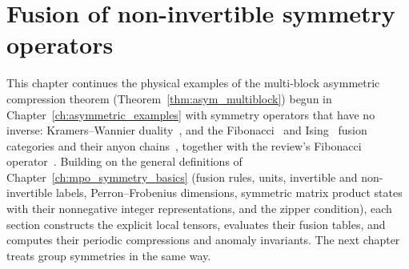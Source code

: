 
\chapter{Fusion of non-invertible symmetry operators}%
\label{ch:asymmetric_examples_non_invertible}

This chapter continues the physical examples of the multi-block asymmetric
compression theorem (Theorem~\ref{thm:asym_multiblock}) begun in
Chapter~\ref{ch:asymmetric_examples} with symmetry operators that have no
inverse: Kramers--Wannier
duality~\cite{KramersWannier1941,Aasen2016Topological,Seiberg2024Majorana,Lootens2023Dualities},
and the Fibonacci~\cite[Appendix~D.1]{Bultinck2017Anyons} and
Ising~\cite[Appendix~D.2]{Bultinck2017Anyons} fusion categories and their
anyon chains~\cite{Feiguin2007GoldenChain}, together with the review's
Fibonacci operator~\cite[Appendix~A, ``The MPO for the Fibonacci model'']{Cirac2021Matrix}.
Building on the general
definitions of Chapter~\ref{ch:mpo_symmetry_basics} (fusion rules, units,
invertible and non-invertible labels, Perron--Frobenius dimensions,
symmetric matrix product states with their nonnegative integer
representations, and the zipper condition), each section constructs
the explicit local tensors, evaluates their fusion tables, and computes
their periodic compressions and anomaly invariants. The next chapter treats
group symmetries in the same way.

%
%
%
%
%
